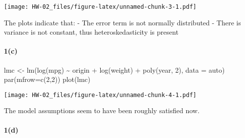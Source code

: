 \documentclass[
]{article}
\newenvironment{Shaded}{\begin{snugshade}}{\end{snugshade}}
\newcommand{\AttributeTok}[1]{\textcolor[rgb]{0.77,0.63,0.00}{#1}}
\newcommand{\DecValTok}[1]{\textcolor[rgb]{0.00,0.00,0.81}{#1}}
\newcommand{\FunctionTok}[1]{\textcolor[rgb]{0.00,0.00,0.00}{#1}}
\newcommand{\NormalTok}[1]{#1}
\newcommand{\OtherTok}[1]{\textcolor[rgb]{0.56,0.35,0.01}{#1}}
\newcommand{\SpecialCharTok}[1]{\textcolor[rgb]{0.00,0.00,0.00}{#1}}
\newcommand{\StringTok}[1]{\textcolor[rgb]{0.31,0.60,0.02}{#1}}
\begin{document}
\texttt{[image: HW-02\_files/figure-latex/unnamed-chunk-3-1.pdf]}

The plots indicate that: - The error term is not normally distributed -
There is variance is not constant, thus heteroskedasticity is present

\hypertarget{c}{%
\paragraph{1(c)}\label{c}}

\begin{Shaded}
\begin{Highlighting}[]
\NormalTok{lmc }\OtherTok{\textless{}{-}} \FunctionTok{lm}\NormalTok{(}\FunctionTok{log}\NormalTok{(mpg) }\SpecialCharTok{\textasciitilde{}}\NormalTok{ origin }\SpecialCharTok{+} \FunctionTok{log}\NormalTok{(weight) }\SpecialCharTok{+} \FunctionTok{poly}\NormalTok{(year, }\DecValTok{2}\NormalTok{), }\AttributeTok{data =}\NormalTok{ auto)}
\FunctionTok{par}\NormalTok{(}\AttributeTok{mfrow=}\FunctionTok{c}\NormalTok{(}\DecValTok{2}\NormalTok{,}\DecValTok{2}\NormalTok{))}
\FunctionTok{plot}\NormalTok{(lmc)}
\end{Highlighting}
\end{Shaded}

\texttt{[image: HW-02\_files/figure-latex/unnamed-chunk-4-1.pdf]}

The model assumptions seem to have been roughly satisfied now.

\hypertarget{d}{%
\paragraph{1(d)}\label{d}}

\begin{Shaded}
\end{Shaded}
\end{document}
